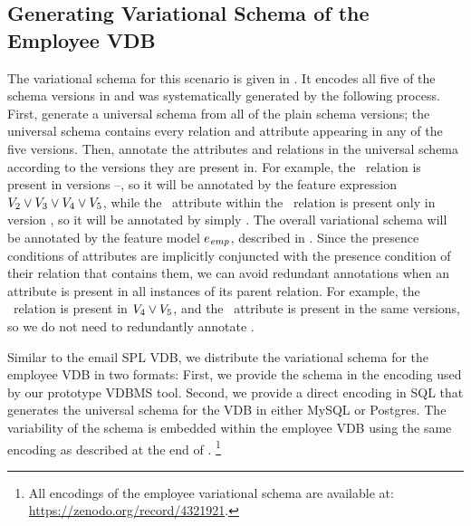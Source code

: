 \subsection{Generating Variational Schema of the Employee VDB}
\label{sec:emp-vsch}



The variational schema for this scenario is given in . It
encodes all five of the schema versions in  and was
systematically generated by the following process. First, generate a universal
schema from all of the plain schema versions; the universal schema contains
every relation and attribute appearing in any of the five versions. Then,
annotate the attributes and relations in the universal schema according to the
versions they are present in.
%
For example, the \empacct\ relation is present in versions \vTwo--\vFive, so it
will be annotated by the feature expression
$\vTwo\vee\vThree\vee\vFour\vee\vFive$, while the \salary\ attribute within the
\empacct\ relation is present only in version \vFive, so it will be annotated
by simply \vFive.
%
 The overall variational schema will be annotated by the feature model
 $\dimMeta_\employee$, described in .
%
Since the presence conditions of attributes are implicitly conjuncted with the
presence condition of their relation
 that contains them, 
 we can avoid redundant
annotations when an attribute is present in all instances of its parent
relation. For example, the \empbio\ relation is present in $\vFour\vee\vFive$,
and the \birthdate\ attribute is present in the same versions, so we do not
need to redundantly annotate 
 \birthdate.

Similar to the email SPL VDB, we distribute the variational schema for the
employee VDB in two formats:
%
First, we provide the schema in the encoding used by our prototype VDBMS tool.%
%
Second, we provide a direct encoding in SQL that generates the universal schema
for the VDB in either MySQL or Postgres.%
%
The variability of the schema is embedded within the employee VDB%
%
using the same encoding as described at the end of .%
\footnote{All encodings of the employee variational schema are available at: \url{https://zenodo.org/record/4321921}.} 

